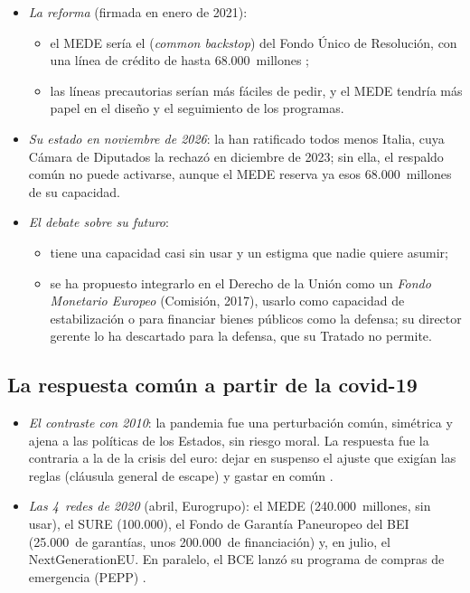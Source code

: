 \documentclass[11pt]{article}
\begin{document}
\begin{itemize}
\item \emph{La reforma} (firmada en enero de 2021)\nocite{MEDE2021Reforma}:
  \begin{itemize}
  \item el MEDE sería el  (\emph{common backstop}) del Fondo Único de Resolución, con una línea de crédito de hasta 68.000~millones ;
  \item las líneas precautorias serían más fáciles de pedir, y el MEDE tendría más papel en el diseño y el seguimiento de los programas.
  \end{itemize}
\item \emph{Su estado en noviembre de 2026}: la han ratificado todos menos Italia, cuya Cámara de Diputados la rechazó en diciembre de 2023; sin ella, el respaldo común no puede activarse, aunque el MEDE reserva ya esos 68.000~millones de su capacidad\nocite{MEDE2026Gramegna,MEDE2026Inversores}.
\item \emph{El debate sobre su futuro}:
  \begin{itemize}
  \item tiene una capacidad casi sin usar y un estigma que nadie quiere asumir;
  \item se ha propuesto integrarlo en el Derecho de la Unión como un \emph{Fondo Monetario Europeo} (Comisión, 2017), usarlo como capacidad de estabilización o para financiar bienes públicos como la defensa; su director gerente lo ha descartado para la defensa, que su Tratado no permite\nocite{MEDE2026Gramegna}.
  \end{itemize}
\end{itemize}

\subsection{La respuesta común a partir de la covid-19}\label{sec:covid}

\begin{itemize}
\item \emph{El contraste con 2010}: la pandemia fue una perturbación común, simétrica y ajena a las políticas de los Estados, sin riesgo moral. La respuesta fue la contraria a la de la crisis del euro: dejar en suspenso el ajuste que exigían las reglas (cláusula general de escape) y gastar en común .
\item \emph{Las 4~redes de 2020} (abril, Eurogrupo): el MEDE (240.000~millones, sin usar), el SURE (100.000), el Fondo de Garantía Paneuropeo del BEI (25.000~de garantías, unos 200.000~de financiación) y, en julio, el NextGenerationEU. En paralelo, el BCE lanzó su programa de compras de emergencia (PEPP) .
\end{itemize}
\end{document}
